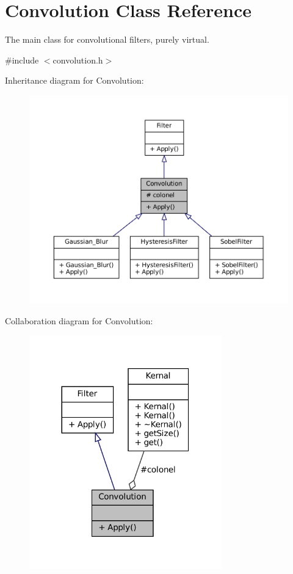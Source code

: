 \hypertarget{classConvolution}{}\section{Convolution Class Reference}
\label{classConvolution}


The main class for convolutional filters, purely virtual.  




{\ttfamily \#include $<$convolution.\+h$>$}



Inheritance diagram for Convolution\+:
\nopagebreak
\begin{figure}[H]
\begin{center}
\leavevmode
\includegraphics[width=350pt]{classConvolution__inherit__graph}
\end{center}
\end{figure}


Collaboration diagram for Convolution\+:
\nopagebreak
\begin{figure}[H]
\begin{center}
\leavevmode
\includegraphics[width=236pt]{classConvolution__coll__graph}
\end{center}
\end{figure}
